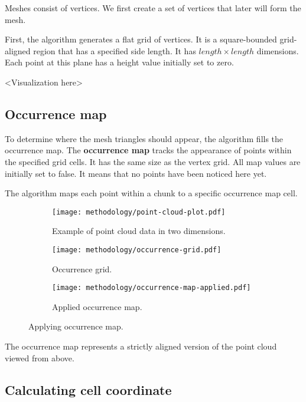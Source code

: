 Meshes consist of vertices. We first create a set of vertices that later will form the mesh.

First, the algorithm generates a flat grid of vertices. It is a square-bounded grid-aligned region that has a specified side length. It has $length \times length$ dimensions. Each point at this plane has a height value initially set to zero.

<Visualization here>


\subsection{Occurrence map}
\label{subsec:occurrence_map}

To determine where the mesh triangles should appear, the algorithm fills the occurrence map. The \textbf{occurrence map} tracks the appearance of points within the specified grid cells. It has the same size as the vertex grid. All map values are initially set to false. It means that no points have been noticed here yet.

The algorithm maps each point within a chunk to a specific occurrence map cell.

\begin{figure}[ht]
    \centering
    
    \begin{subfigure}[t]{0.3\textwidth}
        \texttt{[image: methodology/point-cloud-plot.pdf]}
        \caption{Example of point cloud data in two dimensions.}
    \end{subfigure}
    \begin{subfigure}[t]{0.3\textwidth}
        \texttt{[image: methodology/occurrence-grid.pdf]}
        \caption{Occurrence grid.}
    \end{subfigure}
    
    \begin{subfigure}[t]{0.4\textwidth}
        \texttt{[image: methodology/occurrence-map-applied.pdf]}
        \caption{Applied occurrence map.}
    \end{subfigure}
    
    \caption{Applying occurrence map.}
    \label{fig:occurrence_map}
\end{figure}

The occurrence map represents a strictly aligned version of the point cloud viewed from above.


\subsection{Calculating cell coordinate}
\label{subsec:calculating_cell_coordinate}

